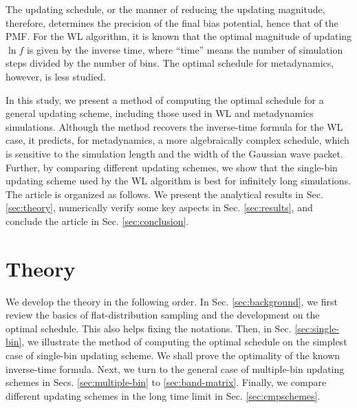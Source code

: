 \documentclass[reprint, floatfix]{revtex4-1}
\begin{document}
The updating schedule,
or the manner of reducing
the updating magnitude\cite{liang2007,
belardinelli2007, belardinelli2007jcp, belardinelli2008,
morozov2007, zhou2008, morozov2009,
komura2012, caparica2012, caparica2014,
barducci2008, dickson2011, dama2014},
therefore,
determines the precision of the final bias potential,
hence that of the PMF.
%
For the WL algorithm, it is known
that the optimal magnitude of updating $\ln f$
is given by the
inverse time\cite{liang2007,
belardinelli2007, belardinelli2007jcp, belardinelli2008,
morozov2007, zhou2008},
where ``time'' means
the number of simulation steps
divided by the number of bins.
%
The optimal schedule for metadynamics,
however, is less studied.


In this study,
we present a method of computing
the optimal schedule
for a general updating scheme,
including those used in WL and metadynamics simulations.
%
Although the method recovers the inverse-time formula
for the WL case,
it predicts, for metadynamics,
a more algebraically complex schedule,
which is sensitive to the simulation length
and the width of the Gaussian wave packet.
%
Further, by comparing
different updating schemes,
we show that
the single-bin updating scheme
used by the WL algorithm
is best for infinitely long simulations.
%
%
The article is organized as follows.
%
We present the analytical results in Sec. \ref{sec:theory},
numerically verify some key aspects
in Sec. \ref{sec:results},
and conclude the article
in Sec. \ref{sec:conclusion}.




\section{\label{sec:theory}
Theory}



We develop the theory
in the following order.
%
In Sec. \ref{sec:background},
we first review the basics of
flat-distribution sampling
and the development on the optimal schedule.
%
This also helps fixing the notations.
%
Then, in Sec. \ref{sec:single-bin},
we illustrate the method of
computing the optimal schedule
on the simplest case of
single-bin updating scheme.
%
We shall prove the optimality
of the known inverse-time formula.
%
Next, we turn to the general case
of multiple-bin updating schemes
in Secs. \ref{sec:multiple-bin}
to \ref{sec:band-matrix}.
%
Finally, we compare different updating schemes
in the long time limit
in Sec. \ref{sec:cmpschemes}.
\end{document}
